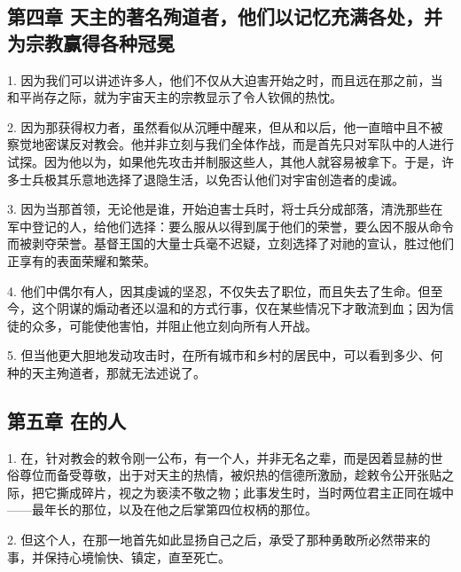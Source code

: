 \subsection{第四章 天主的著名殉道者，他们以记忆充满各处，并为宗教赢得各种冠冕}

1. 因为我们可以讲述许多人，他们不仅从大迫害开始之时，而且远在那之前，当和平尚存之际，就为宇宙天主的宗教显示了令人钦佩的热忱。\par

2. 因为那获得权力者，虽然看似从沉睡中醒来，但从和以后，他一直暗中且不被察觉地密谋反对教会。他并非立刻与我们全体作战，而是首先只对军队中的人进行试探。因为他以为，如果他先攻击并制服这些人，其他人就容易被拿下。于是，许多士兵极其乐意地选择了退隐生活，以免否认他们对宇宙创造者的虔诚。\par

3. 因为当那首领，无论他是谁，开始迫害士兵时，将士兵分成部落，清洗那些在军中登记的人，给他们选择：要么服从以得到属于他们的荣誉，要么因不服从命令而被剥夺荣誉。基督王国的大量士兵毫不迟疑，立刻选择了对祂的宣认，胜过他们正享有的表面荣耀和繁荣。\par

4. 他们中偶尔有人，因其虔诚的坚忍，不仅失去了职位，而且失去了生命。但至今，这个阴谋的煽动者还以温和的方式行事，仅在某些情况下才敢流到血；因为信徒的众多，可能使他害怕，并阻止他立刻向所有人开战。\par

5. 但当他更大胆地发动攻击时，在所有城市和乡村的居民中，可以看到多少、何种的天主殉道者，那就无法述说了。\par


\subsection{第五章 在的人}

1. 在，针对教会的敕令刚一公布，有一个人，并非无名之辈，而是因着显赫的世俗尊位而备受尊敬，出于对天主的热情，被炽热的信德所激励，趁敕令公开张贴之际，把它撕成碎片，视之为亵渎不敬之物；此事发生时，当时两位君主正同在城中——最年长的那位，以及在他之后掌第四位权柄的那位。\par

2. 但这个人，在那一地首先如此显扬自己之后，承受了那种勇敢所必然带来的事，并保持心境愉快、镇定，直至死亡。\par

